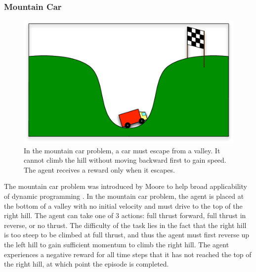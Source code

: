 \subsubsection{Mountain Car}
\begin{figure}[h]
\center
\includegraphics[width=0.75\linewidth]{MC_problem.pdf}
\caption{In the mountain car problem, a car must escape from a valley. It cannot climb the hill without moving backward first to gain speed. The agent receives a reward only when it escapes.}\label{fig:MC:problem}
\end{figure}

The mountain car problem was introduced by Moore to help broad applicability of dynamic programming \cite{Moore1991}. In the mountain car problem, the agent is placed at the bottom of a valley with no initial velocity and must drive to the top of the right hill. The agent can take one of 3 actions: full thrust forward, full thrust in reverse, or no thrust. The difficulty of the task lies in the fact that the right hill is too steep to be climbed at full thrust, and thus the agent must first reverse up the left hill to gain sufficient momentum to climb the right hill. The agent experiences a negative reward for all time steps that it has not reached the top of the right hill, at which point the episode is completed.


